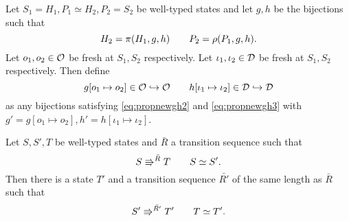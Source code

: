 \begin{definition} \label{def:bijectionmod}
  Let $S_1 = H_1, P_1 \simeq H_2, P_2 = S_2$ be well-typed states and let $g, h$
  be the bijections such that
  \begin{equation} 
    H_2 = \pi(H_1, g, h) \quad\quad P_2 = \rho(P_1, g, h).
  \end{equation}
  Let $o_1, o_2 \in \mathcal{O}$ be fresh at $S_1, S_2$ respectively.
  Let $\iota_1, \iota_2 \in \mathcal{D}$ be fresh at $S_1, S_2$ respectively.
  Then define
  \begin{equation}
    g[o_1 \mapsto o_2] \in \mathcal{O} \hookrightarrow \mathcal{O} 
    \quad\quad h[\iota_1 \mapsto \iota_2] \in \mathcal{D} \hookrightarrow \mathcal{D}
  \end{equation}
  as any bijections satisfying \eqref{eq:propnewgh2} and \eqref{eq:propnewgh3}
  with $g' = g[o_1 \mapsto o_2], h' = h[\iota_1 \mapsto \iota_2]$.
\end{definition}

\begin{lemma} \label{lem:lemma3}
  Let $S, S', T$ be well-typed states and $\bar{R}$ a transition sequence such that
  \begin{equation*}
    S \Rrightarrow^{\bar{R}} T \quad\quad S \simeq S'.
  \end{equation*}
  Then there is a state $T'$ and a transition sequence $\bar{R'}$ of the same
  length as $\bar{R}$ such that
  \begin{equation*}
    S' \Rrightarrow^{\bar{R'}} T' \quad\quad T \simeq T'.
  \end{equation*}
\end{lemma}


